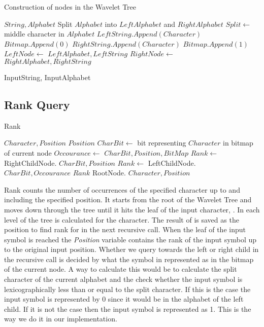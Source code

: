 \begin{algorithm}
\caption{Construction of nodes in the Wavelet Tree}
\label{alg:ConstructNode}
\begin{algorithmic}
 {$String, Alphabet$}
	\State \Return
\EndIf
\State Split $Alphabet$ into $LeftAlphabet$ and $RightAlphabet$
\State $Split \gets$ middle character in $Alphabet$
		\State $LeftString.Append(Character)$
		\State $Bitmap.Append(0)$
	\Else
		\State $RightString.Append(Character)$
		\State $Bitmap.Append(1)$
	\EndIf
\EndFor
\State $LeftNode \gets$  {$LeftAlphabet, LeftString$}
\State $RightNode \gets$  {$RightAlphabet, RightString$}
\EndFunction

\State {} {InputString, InputAlphabet}
\end{algorithmic}
\end{algorithm}

\subsection{Rank Query}
\begin{algorithm}
\caption{Rank}
\label{alg:rank}
\begin{algorithmic} 
 {$Character, Position$}
\State \Return $Position$
\EndIf
\State $CharBit \gets$ bit representing $Character$ in bitmap of current node
\State $Occourance \gets$  {$CharBit, Position, BitMap$}
	\State $Rank \gets$ RightChildNode. {$CharBit, Position$}
\Else
	\State $Rank \gets$ LeftChildNode. {$CharBit, Occourance$}
\EndIf
\State \Return $Rank$ 
\EndFunction
\State RootNode. {$Character, Position$}
\end{algorithmic}
\end{algorithm}

Rank counts the number of occurrences of the specified character up to and including the specified position. 
It starts from the root of the Wavelet Tree and moves down through the tree until it hits the leaf of the input character, \citep[Section 2.2]{Claude08practicalrankselect}. 
In each level of the tree  is calculated for the character. 
The result of  is saved as the position to find rank for in the next recursive call. 
When the leaf of the input symbol is reached the \textit{Position} variable contains the rank of the input symbol up to the original input position.
Whether we query towards the left or right child in the recursive call is decided by what the symbol in represented as in the bitmap of the current node.
A way to calculate this would be to calculate the split character of the current alphabet and the check whether the input symbol is lexicographically less than or equal to the split character. 
If this is the case the input symbol is represented by 0 since it would be in the alphabet of the left child.
If it is not the case then the input symbol is represented as 1.
This is the way we do it in our implementation. \\

